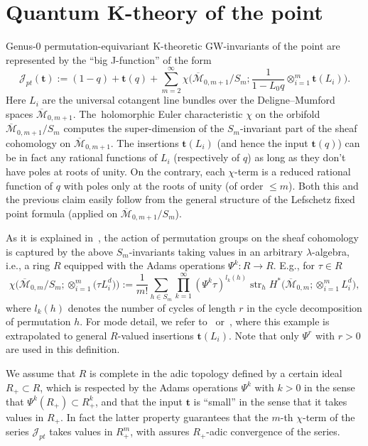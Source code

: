 \documentclass[10pt,a4paper]{amsart}
\numberwithin{equation}{section}
\def\J{\mathcal J}
\def\M{{\overline{\mathcal M}}}
\def\t{{\mathbf t}}
\def\str{\operatorname{str}}
\def\str{\operatorname{str}}
\theoremstyle{definition}
\theoremstyle{plain}
\begin{document}
\section{Quantum K-theory of the point}
\label{Sec3}

Genus-0 permutation-equivariant K-theoretic GW-invariants of the point are represented by the ``big J-function'' of the form
\[
\J_{pt}(\t):=(1-q)+\t(q)+\sum_{m=2}^{\infty}\chi
\bigg(\M_{0,m+1}/S_m; \frac{1}{1-L_0q}\otimes_{i=1}^m \t(L_i)\bigg).
\]
Here $L_i$ are the universal cotangent line bundles over the Deligne--Mumford spaces $\M_{0,m+1}$. The~holomorphic Euler characteristic $\chi$ on the orbifold $\M_{0,m+1}/S_m$ computes the super-dimen\-sion of the $S_m$-invariant part of the sheaf cohomology on $\M_{0,m+1}$. The insertions $\t(L_i)$ (and hence the input $\t(q)$) can be in fact any rational functions of $L_i$ (respectively of $q$) as long as they don't have poles at roots of unity. On the contrary, each $\chi$-term is a reduced rational function of $q$ with poles only at the roots of unity (of order $\leq m$). Both this and the previous claim easily follow from the general structure of the Lefschetz fixed point formula (applied on $\M_{0,m+1}/S_m$).

As it is explained in~\cite{Givental:perm1, Givental:perm9}, the action of permutation groups on the sheaf cohomology is captured by the above $S_m$-invariants taking values in an arbitrary $\lambda$-algebra, i.e., a ring $R$ equipped with the Adams operations $\Psi^k\colon R\to R$. E.g., for $\tau\in R$
\[
\chi\big(\M_{0,m}/S_m;\otimes_{i=1}^m \big(\tau L_i^d\big)\big) := \frac{1}{m!} \sum_{h\in S_m}\prod_{k=1}^{\infty} (\Psi^k\tau)^{l_k(h)} \str_h H^*\big(\M_{0,m};\otimes_{i=1}^mL_i^d\big),
\]
where $l_k(h)$ denotes the number of cycles of length $r$ in the cycle decomposition of permutation $h$. For mode detail, we refer to~\cite{Givental:perm1} or~\cite{Givental:perm9}, where this example is
extrapolated to general $R$-valued insertions $\t(L_i)$. Note that only $\Psi^r$ with $r>0$ are used in this definition.

We assume that $R$ is complete in the adic topology defined by a certain ideal $R_{+}\subset R$, which is respected by the Adams operations $\Psi^k$ with $k>0$ in the sense that $\Psi^k(R_{+})\subset R_{+}^k$, and that the input $\t$ is ``small'' in the sense that it takes values in $R_{+}$. In fact the latter property guarantees that the $m$-th $\chi$-term of the series $\J_{pt}$ takes values in $R_{+}^m$, with assures $R_{+}$-adic convergence of the series.
\end{document}
